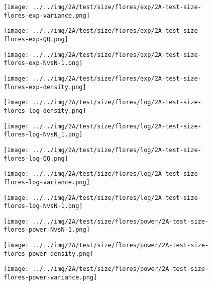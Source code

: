 \begin{figure}[H]
\centering	\texttt{[image: ../../img/2A/test/size/flores/exp/2A-test-size-flores-exp-variance.png]}
\end{figure}
\begin{figure}[H]
\centering	\texttt{[image: ../../img/2A/test/size/flores/exp/2A-test-size-flores-exp-QQ.png]}
\end{figure}
\begin{figure}[H]
\centering	\texttt{[image: ../../img/2A/test/size/flores/exp/2A-test-size-flores-exp-NvsN-1.png]}
\end{figure}
\begin{figure}[H]
\centering	\texttt{[image: ../../img/2A/test/size/flores/exp/2A-test-size-flores-exp-density.png]}
\end{figure}
\begin{figure}[H]
\centering	\texttt{[image: ../../img/2A/test/size/flores/log/2A-test-size-flores-log-density.png]}
\end{figure}
\begin{figure}[H]
\centering	\texttt{[image: ../../img/2A/test/size/flores/log/2A-test-size-flores-log-NvsN\_1.png]}
\end{figure}
\begin{figure}[H]
\centering	\texttt{[image: ../../img/2A/test/size/flores/log/2A-test-size-flores-log-QQ.png]}
\end{figure}
\begin{figure}[H]
\centering	\texttt{[image: ../../img/2A/test/size/flores/log/2A-test-size-flores-log-variance.png]}
\end{figure}
\begin{figure}[H]
\centering	\texttt{[image: ../../img/2A/test/size/flores/log/2A-test-size-flores-log-NvsN-1.png]}
\end{figure}
\begin{figure}[H]
\centering	\texttt{[image: ../../img/2A/test/size/flores/power/2A-test-size-flores-power-NvsN-1.png]}
\end{figure}
\begin{figure}[H]
\centering	\texttt{[image: ../../img/2A/test/size/flores/power/2A-test-size-flores-power-density.png]}
\end{figure}
\begin{figure}[H]
\centering	\texttt{[image: ../../img/2A/test/size/flores/power/2A-test-size-flores-power-variance.png]}
\end{figure}
